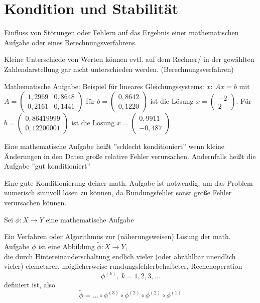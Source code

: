 \documentclass[../Skript.tex]{subfiles}
\begin{document}
\section{Kondition und Stabilität}
Einfluss von Störungen oder Fehlern auf das Ergebnis einer mathematischen Aufgabe oder eines Berechnungsverfahrens.\\
\begin{example} Kleine Unterschiede von Werten können evtl. auf dem Rechner/ in der gewählten Zahlendarstellung gar nicht unterschieden werden. (Berechnungsverfahren)
\end{example}
\begin{example}
    
Mathematische Aufgabe: Beispiel für lineares Gleichungssystems: $x:\ Ax=b$ mit $A= \begin{pmatrix}
1,2969 & 0,8648 \\
0,2161 & 0,1441 
\end{pmatrix}  $
für $b= \begin{pmatrix}
0,8642 \\
0,1220 
\end{pmatrix}  $ ist die Lösung $x= \begin{pmatrix}
-2 \\
2 
\end{pmatrix}  $.
Für $b= \begin{pmatrix}
0,86419999 \\
0,12200001 
\end{pmatrix}  $ ist die Lösung $x=\begin{pmatrix}
0,9911 \\
-0,487 
\end{pmatrix}  $
\end{example}
\begin{definition} Eine mathematische Aufgabe heißt ''schlecht konditioniert'' wenn kleine Änderungen in den Daten große relative Fehler verursachen.
Andernfalls heißt die Aufgabe ''gut konditioniert''
\end{definition}
\begin{remark}Eine gute Konditionierung deiner math. Aufgabe ist notwendig, um das Problem numerisch sinnvoll lösen zu können, da Rundungsfehler sonst große Fehler verursachen können.
\end{remark}
Sei $ \phi : X\to Y$ eine mathematische Aufgabe\\
\begin{definition}
    
Ein Verfahren oder  Algorithmus zur (näherungsweisen) Lösung der math. Aufgabe $\phi$ ist eine Abbildung $\tilde{\phi} :X\to Y$, \\
die durch Hintereinanderschaltung endlich vieler (oder abzählbar unendlich 
vieler) elemetarer, möglicherweise rundungsfehlerbehafteter, Rechenoperation 
$$\phi^{(k)},\ k= 1,2,3,\dots$$ definiert ist, also $$\tilde{\phi}=\dots \circ 
\phi^{(3)} \circ \phi^{(2)} \circ \phi^{(2)} \circ \phi^{(1)}$$
\end{definition}
\end{document}
